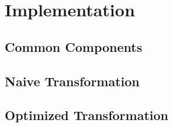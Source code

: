 \chapter{Implementation}

\section{Common Components}

\section{Naive Transformation}

\section{Optimized Transformation}



